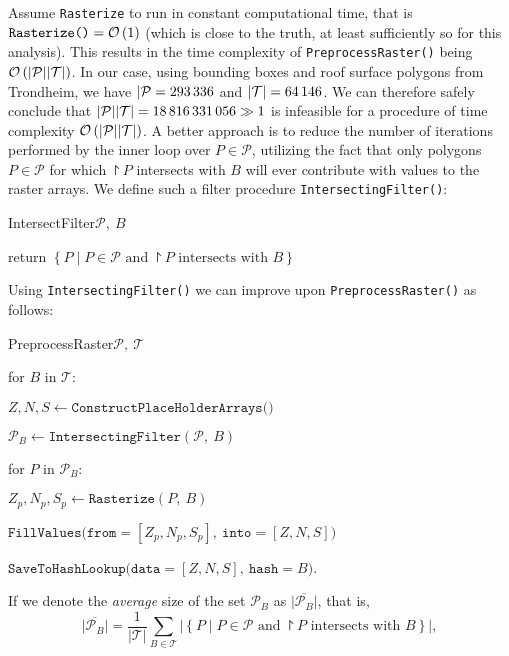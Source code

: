 Assume \texttt{Rasterize} to run in constant computational time, that is $\texttt{Rasterize()} = \mathcal{O}\left(1\right)$ (which is close to the truth, at least sufficiently so for this analysis).
This results in the time complexity of \texttt{PreprocessRaster()} being $\mathcal{O}\left(|\mathcal{P}| |\mathcal{T}|\right)$.
In our case, using bounding boxes and roof surface polygons from Trondheim, we have $|\mathcal{P} = \num{293336}$ and $|\mathcal{T}| = \num{64146}$.
We can therefore safely conclude that $|\mathcal{P}||\mathcal{T}| = \num{18816331056} \gg 1$ is infeasible for a procedure of time complexity $\mathcal{O}\left(|\mathcal{P}| |\mathcal{T}|\right)$.
A better approach is to reduce the number of iterations performed by the inner loop over $P \in \mathcal{P}$, utilizing the fact that only polygons $P \in \mathcal{P}$ for which $\project{P}$ intersects with $B$ will ever contribute with values to the raster arrays.
We define such a filter procedure \texttt{IntersectingFilter()}:
%
\begin{pseudofunc}{IntersectFilter}{$\mathcal{P},~B$}
  \item return $\left\{P \mid P \in \mathcal{P} \text{ and } \project{P} \text{ intersects with } B \right\}$
\end{pseudofunc}
%
Using \texttt{IntersectingFilter()} we can improve upon \texttt{PreprocessRaster()} as follows:
%
\begin{pseudofunc}{PreprocessRaster}{$\mathcal{P},~\mathcal{T}$}
  \item for $B$ in $\mathcal{T}$:
  \begin{pseudoloop}
    \item $Z, N, S \leftarrow \texttt{ConstructPlaceHolderArrays()}$
    \item $\mathcal{P}_B \leftarrow \texttt{IntersectingFilter}(\mathcal{P},~B)$
    \item for $P$ in $\mathcal{P}_B$:
    \begin{pseudoloop}
      \item $Z_p, N_p, S_p \leftarrow \texttt{Rasterize}(P,~B)$
      \item $\texttt{FillValues(from}=[Z_p, N_p, S_p],~\texttt{into}=[Z, N, S])$
    \end{pseudoloop}
    \item $\texttt{SaveToHashLookup(data}=[Z, N, S],~\texttt{hash}=B)$.
  \end{pseudoloop}
\end{pseudofunc}
%
If we denote the \textit{average} size of the set $\mathcal{P}_B$ as $\overline{|\mathcal{P}_B|}$, that is,
%
\begin{equation*}
  \overline{|\mathcal{P}_B|}
  =
  \frac{1}{|\mathcal{T}|}
  \sum_{B \in \mathcal{T}}
  \big|
    \left\{P \mid P \in \mathcal{P} \text{ and } \project{P} \text{ intersects with } B \right\}
  \big|,
\end{equation*}

